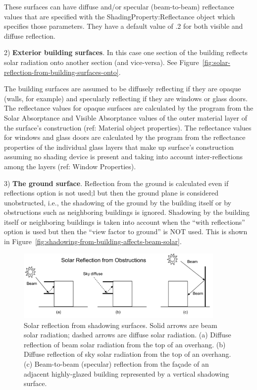 These surfaces can have diffuse and/or specular (beam-to-beam) reflectance values that are specified with the Shad\-ing\-Property:\-Re\-flectance object which specifies those parameters. They have a default value of .2 for both visible and diffuse reflection.

2) \textbf{Exterior building surfaces}. In this case one section of the building reflects solar radiation onto another section (and vice-versa). See Figure~\ref{fig:solar-reflection-from-building-surfaces-onto}.

The building surfaces are assumed to be diffusely reflecting if they are opaque (walls, for example) and specularly reflecting if they are windows or glass doors. The reflectance values for opaque surfaces are calculated by the program from the Solar Absorptance and Visible Absorptance values of the outer material layer of the surface's construction (ref: Material object properties). The reflectance values for windows and glass doors are calculated by the program from the reflectance properties of the individual glass layers that make up surface's construction assuming no shading device is present and taking into account inter-reflections among the layers (ref: Window Properties).

3) \textbf{The ground surface}. Reflection from the ground is calculated even if reflections option is not used;l but then the ground plane is considered unobstructed, i.e., the shadowing of the ground by the building itself or by obstructions such as neighboring buildings is ignored. Shadowing by the building itself or neighboring buildings is taken into account when the ``with reflections'' option is used but then the ``view factor to ground'' is NOT used. This is shown in Figure~\ref{fig:shadowing-from-building-affects-beam-solar}.

\begin{figure}[hbtp] %
\centering
\includegraphics[width=0.9\textwidth, height=0.7\textheight, keepaspectratio=true]{media/image003.png}
\caption{  Solar reflection from shadowing surfaces. Solid arrows are beam solar radiation; dashed arrows are diffuse solar radiation. (a) Diffuse reflection of beam solar radiation from the top of an overhang. (b) Diffuse reflection of sky solar radiation from the top of an overhang. (c) Beam-to-beam (specular) reflection from the façade of an adjacent highly-glazed building represented by a vertical shadowing surface. \protect \label{fig:solar-reflection-from-shadowing-surfaces.}}
\end{figure}

